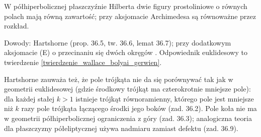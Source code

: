 \begin{theorem}
	W półhiperbolicznej płaszczyźnie Hilberta dwie figury prostoliniowe o równych polach mają równą zawartość; przy aksjomacie Archimedesa są równoważne przez rozkład. %
\end{theorem}

Dowody: Hartshorne \cite[s. 330--332]{hartshorne_2000} (prop. 36.5, tw. 36.6, lemat 36.7); przy dodatkowym aksjomacie (E) o przecinaniu się dwóch okręgów \cite[s. 361--362]{hartshorne_2000}. %
Odpowiednik euklidesowy to twierdzenie \ref{twierdzenie_wallace_bolyai_gerwien}. %

Hartshorne \cite[s. 332--333]{hartshorne_2000} zauważa też, że pole trójkąta nie da się porównywać tak jak w geometrii euklidesowej (gdzie środkowy trójkąt ma czterokrotnie mniejsze pole): dla każdej stałej $k > 1$ istnieje trójkąt równoramienny, którego pole jest mniejsze niż $k$ razy pole trójkąta łączącego środki jego boków (zad. 36.2). %
Pole koła nie ma w geometrii półhiperbolicznej ograniczenia z góry (zad. 36.3); analogiczna teoria dla płaszczyzny półeliptycznej używa nadmiaru zamiast defektu (zad. 36.9). %


